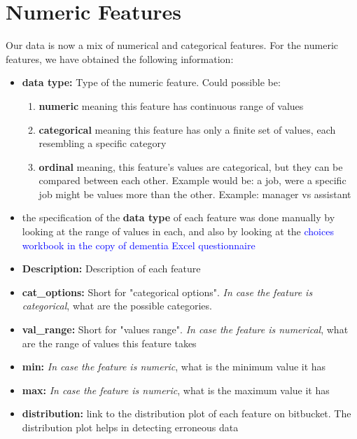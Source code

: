 \documentclass{article}
\begin{document}
\section{Numeric Features}
\label{sec:numeric}
Our data is now a mix of numerical and categorical features. For the numeric features, we have obtained the following information:
\begin{itemize}
\item \textbf{data type:} Type of the numeric feature. Could possible be: 
\begin{enumerate}
\item \textbf{numeric} meaning this feature has continuous range of values

\item \textbf{categorical} meaning this feature has only a finite set of values, each resembling a specific category

\item \textbf{ordinal} meaning, this feature's values are categorical, but they can be compared between each other. Example would be: a job, were a specific job might be values more than the other. Example: manager vs assistant
\end{enumerate}

\item[] the specification of the \textbf{data type} of each feature was done manually by looking at the range of values in each, and also by looking at the \textcolor{blue}{choices workbook in the copy of dementia Excel questionnaire}

\item \textbf{Description:} Description of each feature

\item \textbf{cat\_options:} Short for "categorical options". \textit{In case the feature is categorical}, what are the possible categories.

\item \textbf{val\_range:} Short for "values range". \textit{In case the feature is numerical}, what are the range of values this feature takes

\item \textbf{min:} \textit{In case the feature is numeric}, what is the minimum value it has

\item \textbf{max:} \textit{In case the feature is numeric}, what is the maximum value it has

\item \textbf{distribution:} link to the distribution plot of each feature on bitbucket. The distribution plot helps in detecting erroneous data


\end{itemize}
\end{document}
